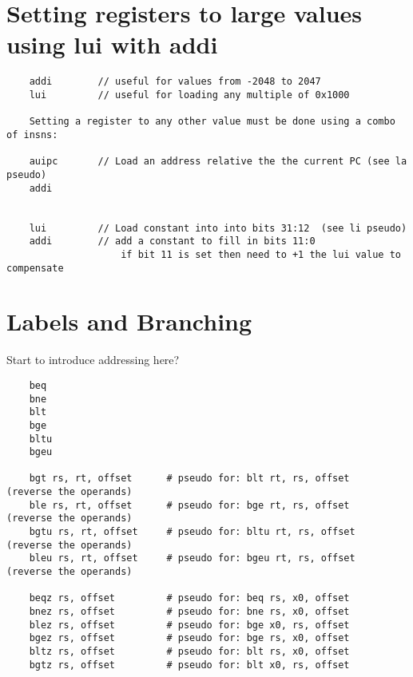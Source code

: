 \section{Setting registers to large values using lui with addi}

\label{insn:lui}
\label{insn:auipc}
\begin{verbatim}
    addi        // useful for values from -2048 to 2047
    lui         // useful for loading any multiple of 0x1000

    Setting a register to any other value must be done using a combo of insns:

    auipc       // Load an address relative the the current PC (see la pseudo)
    addi


    lui         // Load constant into into bits 31:12  (see li pseudo)
    addi        // add a constant to fill in bits 11:0
                    if bit 11 is set then need to +1 the lui value to compensate
\end{verbatim}


\section{Labels and Branching}

Start to introduce addressing here?

\label{insn:beq}
\label{insn:bne}
\label{insn:blt}
\label{insn:bge}
\label{insn:bltu}
\label{insn:bgeu}
\label{insn:bgt}
\label{insn:ble}
\label{insn:bgtu}
\label{insn:beqz}
\label{insn:bnez}
\label{insn:blez}
\label{insn:bgez}
\label{insn:bltz}
\label{insn:bgtz}
\begin{verbatim}
    beq
    bne
    blt
    bge
    bltu
    bgeu

    bgt rs, rt, offset      # pseudo for: blt rt, rs, offset    (reverse the operands)
    ble rs, rt, offset      # pseudo for: bge rt, rs, offset    (reverse the operands)
    bgtu rs, rt, offset     # pseudo for: bltu rt, rs, offset   (reverse the operands)
    bleu rs, rt, offset     # pseudo for: bgeu rt, rs, offset   (reverse the operands)

    beqz rs, offset         # pseudo for: beq rs, x0, offset
    bnez rs, offset         # pseudo for: bne rs, x0, offset
    blez rs, offset         # pseudo for: bge x0, rs, offset
    bgez rs, offset         # pseudo for: bge rs, x0, offset
    bltz rs, offset         # pseudo for: blt rs, x0, offset
    bgtz rs, offset         # pseudo for: blt x0, rs, offset
\end{verbatim}



